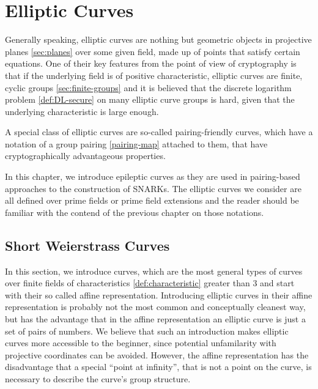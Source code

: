 \chapter{Elliptic Curves}\label{chap:elliptic-curves}
\label{chap:elliptic_curves}
Generally speaking, elliptic curves are nothing but geometric objects in projective planes \ref{sec:planes} over some given field, made up of points that satisfy certain equations. One of their key features from the point of view of cryptography is that if the underlying field is of positive characteristic, elliptic curves are finite, cyclic groups \ref{sec:finite-groups} and it is believed that the discrete logarithm problem \ref{def:DL-secure} on many elliptic curve groups is hard, given that the underlying characteristic is large enough. 

A special class of elliptic curves are so-called pairing-friendly curves, which have a notation of a group pairing \ref{pairing-map} attached to them, that have cryptographically advantageous properties. 

In this chapter, we introduce epileptic curves as they are used in pairing-based approaches to the construction of SNARKs. The elliptic curves we consider are all defined over prime fields or prime field extensions and the reader should be familiar with the contend of the previous chapter on those notations. 

\section{Short Weierstrass Curves}
\label{sec:short_weierstrass_curve}
In this section, we introduce  curves, which are the most general types of curves over finite fields of characteristics \ref{def:characteristic} greater than $3$ and start with their so called affine representation. Introducing elliptic curves in their affine representation is probably not the most common and conceptually cleanest way, but has the advantage that in the affine representation an elliptic curve is just a set of pairs of numbers. We believe that such an introduction makes elliptic curves more accessible to the beginner, since potential unfamilarity with projective coordinates can be avoided. However, the affine representation has the disadvantage that a special ``point at infinity'', that is not a point on the curve, is necessary to describe the curve's group structure. 

